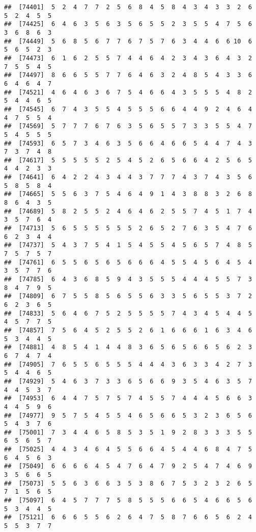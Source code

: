 \documentclass[
]{book}
\begin{document}
\begin{verbatim}
##  [74401]  5  2  4  7  7  2  5  6  8  4  5  8  4  3  4  3  3  2  6  5  2  4  5  5
##  [74425]  6  4  6  3  5  6  3  5  6  5  5  2  3  5  5  4  7  5  6  3  6  8  6  3
##  [74449]  5  6  8  5  6  7  7  6  7  5  7  6  3  4  4  6  6 10  6  5  6  5  2  3
##  [74473]  6  1  6  2  5  5  7  4  4  6  4  2  3  4  3  6  4  3  2  7  5  5  4  5
##  [74497]  8  6  6  5  5  7  7  6  4  6  3  2  4  8  5  4  3  3  6  6  4  6  4  7
##  [74521]  4  6  4  6  3  6  7  5  4  6  6  4  3  5  5  5  4  8  2  5  4  4  6  5
##  [74545]  6  7  4  3  5  5  4  5  5  5  6  6  4  4  9  2  4  6  4  4  7  5  5  4
##  [74569]  5  7  7  7  6  7  6  3  5  6  5  5  7  3  3  5  5  4  7  5  4  5  5  5
##  [74593]  6  5  7  3  4  6  3  5  6  6  4  6  6  5  4  4  7  4  3  7  3  7  4  8
##  [74617]  5  5  5  5  5  2  5  4  5  2  6  5  6  6  4  2  5  6  5  4  4  2  3  3
##  [74641]  6  4  2  2  4  3  4  4  3  7  7  7  4  3  7  4  3  5  6  5  8  5  8  4
##  [74665]  5  5  6  3  7  5  4  6  4  9  1  4  3  8  8  3  2  6  8  8  6  4  3  5
##  [74689]  5  8  2  5  5  2  4  6  4  6  2  5  5  7  4  5  1  7  4  3  5  7  6  4
##  [74713]  5  6  5  5  5  5  5  5  2  6  5  2  7  6  3  5  4  7  6  6  2  3  4  4
##  [74737]  5  4  3  7  5  4  1  5  4  5  5  4  5  6  5  7  4  8  5  7  5  7  5  7
##  [74761]  6  5  5  6  5  6  5  6  6  6  4  5  5  4  5  6  4  5  4  3  5  7  7  6
##  [74785]  6  4  3  6  8  5  9  4  3  5  5  5  4  4  4  5  5  7  3  8  4  7  9  5
##  [74809]  6  7  5  5  8  5  6  5  5  6  3  3  5  6  5  5  3  7  2  6  2  3  6  5
##  [74833]  5  6  4  6  7  5  2  5  5  5  5  7  4  3  4  5  4  4  5  4  5  7  7  5
##  [74857]  7  5  6  4  5  2  5  5  2  6  1  6  6  6  1  6  3  4  6  5  3  4  4  5
##  [74881]  4  8  5  4  1  4  4  8  3  6  5  6  5  6  6  5  6  2  3  6  7  4  7  4
##  [74905]  7  6  5  5  6  5  5  5  4  4  4  3  6  3  3  4  2  7  3  5  4  4  6  5
##  [74929]  5  4  6  3  7  3  3  6  5  6  6  9  3  5  4  6  3  5  7  4  4  5  3  7
##  [74953]  6  4  4  7  5  7  5  7  4  5  5  7  4  4  4  5  6  6  3  4  4  5  9  6
##  [74977]  9  5  7  5  4  5  5  4  6  5  6  6  5  3  2  3  6  5  6  5  4  3  7  6
##  [75001]  7  3  4  4  6  5  8  5  3  5  1  9  2  8  3  3  3  5  5  6  5  6  5  7
##  [75025]  4  4  3  4  6  4  5  5  6  6  4  5  4  4  6  8  4  7  5  6  4  5  6  3
##  [75049]  6  6  6  6  4  5  4  7  6  4  7  9  2  5  4  7  4  6  9  3  5  6  6  5
##  [75073]  5  5  6  3  6  6  3  5  3  8  6  7  5  3  2  3  2  6  5  7  1  5  6  5
##  [75097]  6  4  5  7  7  7  5  8  5  5  5  6  6  5  4  6  6  5  6  5  3  4  4  5
##  [75121]  6  6  6  5  5  6  2  6  4  7  5  8  7  6  6  5  6  2  4  5  5  3  7  7

\end{verbatim}
\end{document}
